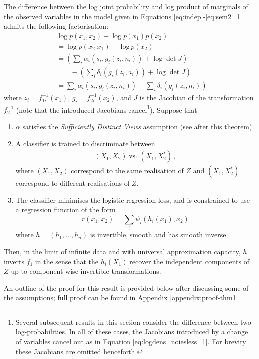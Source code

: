 \begin{theorem}
	\label{thm:noiseless1}
	The difference between the log joint probability and log product of marginals of the observed variables in the model given in Equations \ref{eq:indep}-\ref{eq:sem2_1} admits the following factorisation:
	\begin{align}
	&\log p({x}_1, {x}_2) - \log p({x}_1) p({x}_2) \nonumber \\
	&= \log p({x}_2 | {x}_1) - \log p({x}_2) \nonumber\\
	&= \left(\sum_i \alpha_i(s_{i}, g_i(z_i, n_i)) + \log \det J \right) \nonumber\\
	&\qquad - \left( \sum_i \delta_i(g_i(z_i, n_i)) + \log \det J\right) \nonumber\\
	&= \sum_i \alpha_i(s_{i}, g_i(z_i, n_i)) - \sum_i \delta_i(g_i(z_i, n_i))\label{eq:logdens_noiesless_1} \,
	\end{align}
	where $z_i=f^{-1}_{1i}({x}_1)$, $g_i=f^{-1}_{2i}({x}_2)$,
	and $J$ is the Jacobian of the transformation $f^{-1}_2$ (note that the introduced Jacobians cancel\footnote{Several subsequent results in this section consider the difference between two log-probabilities.
In all of these cases, the Jacobians introduced by a change of variables cancel out as in Equation \ref{eq:logdens_noiesless_1}.
For brevity these Jacobians are omitted henceforth.}).
	Suppose that
	\begin{enumerate}
		\item $\alpha$ satisfies the \emph{Sufficiently Distinct Views} assumption (see after this theorem).
		\item A classifier is trained to discriminate between
		\begin{align*}
		(X_{1},X_{2}) \text{ vs. } (X_{1},X_{2}^{*})\,,
		\end{align*}
		where $({X}_{1},{X}_{2})$ correspond to the same realisation of $Z$ and $({X}_{1},{X}_{2}^{*})$ correspond to different realisations of ${Z}$.
		\item The classifier minimises the logistic regression loss, and is constrained to use a regression function of the form
		\begin{equation*}
		r({x}_{1},{x}_{2})=\sum_{i}\psi_{i}(h_{i}({x}_{1}),{x}_{2})
		\end{equation*}
		where ${h} =(h_{1}, \ldots, h_{n})$  is invertible, smooth and has smooth inverse.
	\end{enumerate}
	
	Then, in the limit of infinite data and with universal approximation capacity, $h$ inverts ${f}_1$ in the sense that the $h_{i}(X_1)$ recover the independent components of $Z$ up to component-wise invertible transformations.
\end{theorem}
An outline of the proof for this result is provided below after discussing some of the assumptions; full proof can be found in Appendix \ref{appendix:proof-thm1}.

